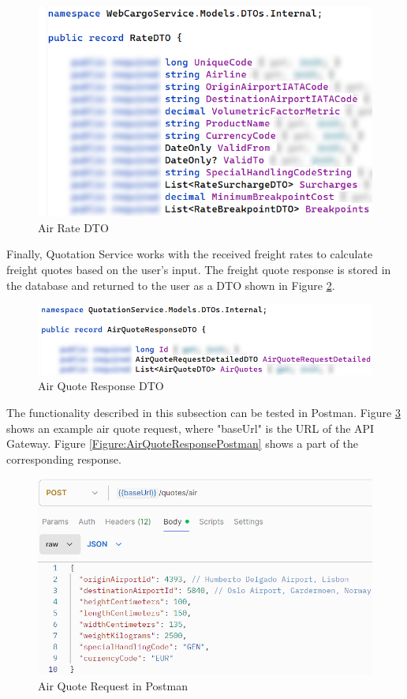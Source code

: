 \documentclass[12pt, reqno]{amsbook}
\theoremstyle{definition}
\theoremstyle{definition}
\numberwithin{section}{chapter}
\numberwithin{table}{chapter}
\numberwithin{figure}{chapter}
\begin{document}
\begin{figure}[H]
  \centering
  \includegraphics[width=0.75\linewidth]{images/AirRateDTO.png}
  \caption{\label{Figure:AirRateDTO}Air Rate DTO}
\end{figure}

Finally, Quotation Service works with the received freight rates to calculate freight quotes based on the user's input. The freight quote response is stored in the database and returned to the user as a \ac{DTO} shown in Figure \ref{Figure:AirQuoteResponseDTO}.

\begin{figure}[H]
  \centering
  \includegraphics[width=0.9\linewidth]{images/AirQuoteResponseDTO.png}
  \caption{\label{Figure:AirQuoteResponseDTO}Air Quote Response DTO}
\end{figure}

The functionality described in this subsection can be tested in Postman. Figure \ref{Figure:AirQuoteRequestPostman} shows an example air quote request, where "baseUrl" is the \ac{URL} of the API Gateway. Figure \ref{Figure:AirQuoteResponsePostman} shows a part of the corresponding response.


\begin{figure}[H]
  \centering
  \includegraphics[width=0.9\linewidth]{images/AirQuoteRequestPostman.png}
  \caption{\label{Figure:AirQuoteRequestPostman}Air Quote Request in Postman}
\end{figure}
\end{document}
